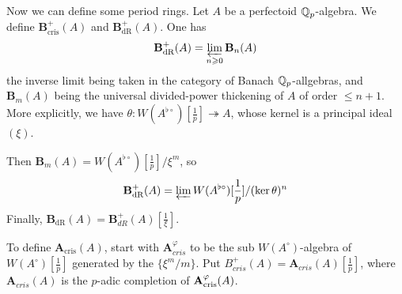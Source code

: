 \documentclass{article}
\begin{document}
Now we can define some period rings. Let $A$ be a perfectoid $\mathbb{Q}_p$-algebra. 
We define $\mathbf B_\text{cris}^+(A)$ and $\mathbf B_\text{dR}^+(A)$. 
One has 
\[
  \mathbf{B}_\textnormal{dR}^+(A) = \varprojlim_{n\geqslant 0} \mathbf B_n(A)
\]
the inverse limit being taken in the category of Banach $\mathbb{Q}_p$-allgebras, and 
$\mathbf B_m(A)$ being the universal divided-power thickening of $A$ of order 
$\leqslant n+1$. More explicitly, we have 
$\theta:W(A^{\flat\circ})[\frac 1 p] \twoheadrightarrow A$, whose kernel is 
a principal ideal $(\xi)$. 

Then $\mathbf B_m(A) = W(A^{\flat\circ})[\frac 1 p]/\xi^m$, so 
\[
  \mathbf B_\text{dR}^+(A) = \varprojlim W(A^{\flat\circ})[\frac 1 p]/(\ker\theta)^n
\]
Finally, $\mathbf B_\text{dR}(A) = \mathbf B_{dR}^+(A)[\frac 1 \xi]$. 

To define $\mathbf A_\text{cris}(A)$, start with $\mathbf A_{cris}^\varphi$ to be the sub $W(A^\circ)$-algebra of 
$W(A^\circ)[\frac 1 p]$ generated by the $\{\xi^m / m\}$. Put 
$B_{cris}^+(A) = \mathbf A_{cris}(A)[\frac 1 p]$, where $\mathbf A_{cris}(A)$ is the $p$-adic 
completion of $\mathbf{A}_\textnormal{cris}^\varphi(A)$. 






\end{document}
